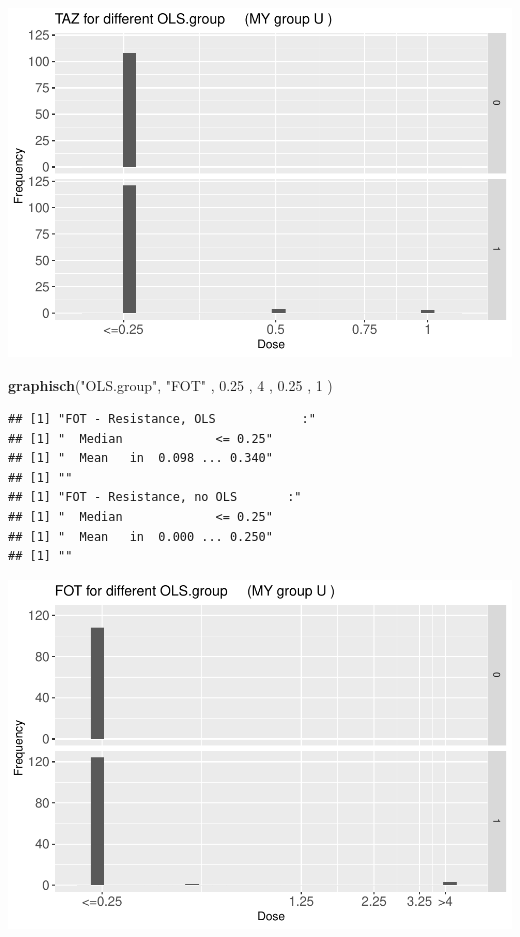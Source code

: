 \documentclass[
]{article}
\newenvironment{Shaded}{\begin{snugshade}}{\end{snugshade}}
\newcommand{\DecValTok}[1]{\textcolor[rgb]{0.00,0.00,0.81}{#1}}
\newcommand{\FloatTok}[1]{\textcolor[rgb]{0.00,0.00,0.81}{#1}}
\newcommand{\KeywordTok}[1]{\textcolor[rgb]{0.13,0.29,0.53}{\textbf{#1}}}
\newcommand{\NormalTok}[1]{#1}
\newcommand{\StringTok}[1]{\textcolor[rgb]{0.31,0.60,0.02}{#1}}
\begin{document}
\includegraphics{Verteilungen_files/figure-latex/unnamed-chunk-24-1.pdf}

\begin{Shaded}
\begin{Highlighting}[]
  \KeywordTok{graphisch}\NormalTok{(}\StringTok{"OLS.group"}\NormalTok{, }\StringTok{"FOT"}\NormalTok{ , }\FloatTok{0.25}\NormalTok{ ,   }\DecValTok{4}\NormalTok{   ,   }\FloatTok{0.25}\NormalTok{ ,   }\DecValTok{1}\NormalTok{     )  }
\end{Highlighting}
\end{Shaded}

\begin{verbatim}
## [1] "FOT - Resistance, OLS            :"
## [1] "  Median             <= 0.25"
## [1] "  Mean   in  0.098 ... 0.340"
## [1] ""
## [1] "FOT - Resistance, no OLS       :"
## [1] "  Median             <= 0.25"
## [1] "  Mean   in  0.000 ... 0.250"
## [1] ""
\end{verbatim}

\includegraphics{Verteilungen_files/figure-latex/unnamed-chunk-25-1.pdf}
\end{document}
